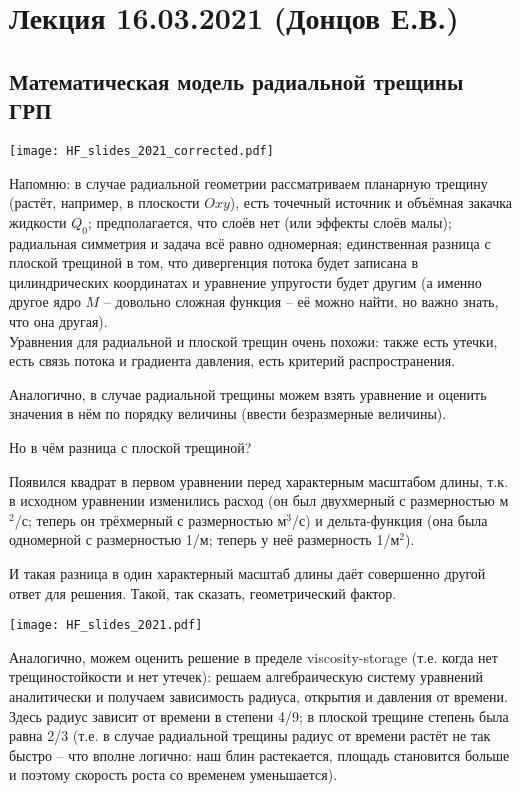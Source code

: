 \documentclass[main.tex]{subfiles}
\begin{document}

\section{Лекция 16.03.2021 (Донцов Е.В.)}

\subsection{Математическая модель радиальной трещины ГРП}

\texttt{[image: HF\_slides\_2021\_corrected.pdf]}

Напомню: в случае радиальной геометрии рассматриваем планарную трещину (растёт, например, в плоскости $Oxy$), есть точечный источник и объёмная закачка жидкости $Q_0$; предполагается, что слоёв нет (или эффекты слоёв малы);
радиальная симметрия и задача всё равно одномерная; единственная разница с плоской трещиной в том, что дивергенция потока будет записана в цилиндрических координатах и уравнение упругости будет другим (а именно другое ядро $M$ -- довольно сложная функция -- её можно найти, но важно знать, что она другая).
\\

Уравнения для радиальной и плоской трещин очень похожи: также есть утечки, есть связь потока и градиента давления, есть критерий распространения.

Аналогично, в случае радиальной трещины можем взять уравнение и оценить значения в нём по порядку величины (ввести безразмерные величины).

Но в чём разница с плоской трещиной?

Появился квадрат в первом уравнении перед характерным масштабом длины, т.к. в исходном уравнении изменились расход (он был двухмерный с размерностью м$^2$/с; теперь он трёхмерный с размерностью м$^3$/с) и дельта-функция (она была одномерной с размерностью 1/м; теперь у неё размерность 1/м$^2$).

И такая разница в один характерный масштаб длины даёт совершенно другой ответ для решения.
Такой, так сказать, геометрический фактор.

\texttt{[image: HF\_slides\_2021.pdf]}

Аналогично, можем оценить решение в пределе viscosity-storage (т.е. когда нет трещиностойкости и нет утечек): решаем алгебраическую систему уравнений аналитически и получаем зависимость радиуса, открытия и давления от времени.
Здесь радиус зависит от времени в степени 4/9; в плоской трещине степень была равна 2/3 (т.е. в случае радиальной трещины радиус от времени растёт не так быстро -- что вполне логично: наш блин растекается, площадь становится больше и поэтому скорость роста со временем уменьшается).
\end{document}
